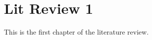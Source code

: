 \graphicspath{{main-matter/lit-review-1/resources/}}

\chapter{Lit Review 1}\label{chap_lr1}

This is the first chapter of the literature review.